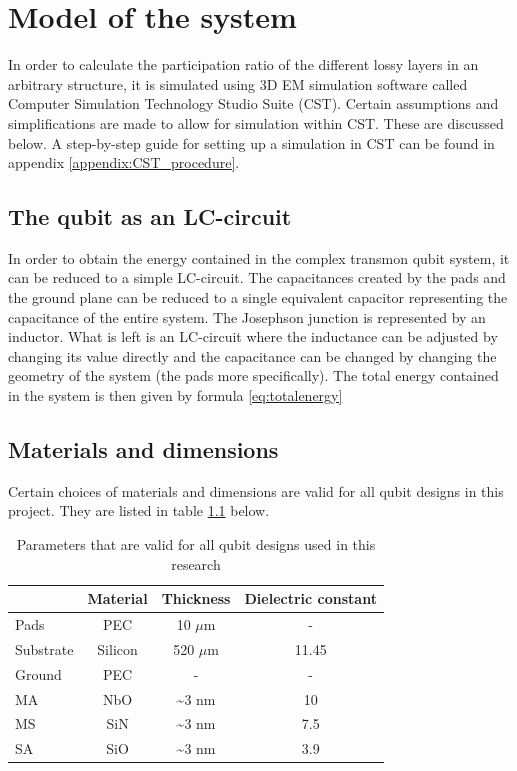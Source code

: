 \chapter{Model of the system}
In order to calculate the participation ratio of the different lossy layers in an arbitrary structure, it is simulated using 3D EM simulation software called Computer Simulation Technology Studio Suite (CST). Certain assumptions and simplifications are made to allow for simulation within CST. These are discussed below. A step-by-step guide for setting up a simulation in CST can be found in appendix \ref{appendix:CST_procedure}.

\section{The qubit as an LC-circuit}
In order to obtain the energy contained in the complex transmon qubit system, it can be reduced to a simple LC-circuit. The capacitances created by the pads and the ground plane can be reduced to a single equivalent capacitor representing the capacitance of the entire system. The Josephson junction is represented by an inductor. What is left is an LC-circuit where the inductance can be adjusted by changing its value directly and the capacitance can be changed by changing the geometry of the system (the pads more specifically). The total energy contained in the system is then given by formula \eqref{eq:totalenergy}

\section{Materials and dimensions}
Certain choices of materials and dimensions are valid for all qubit designs in this project. They are listed in table \ref{table:standard_parameters} below.

\begin{table}
	\begin{center}
		\begin{tabular}{ | l || c | c | c |}
			\hline
			 & Material & Thickness & Dielectric constant \\ \hline
			Pads & PEC & 10 \(\mu\)m & - \\
			Substrate & Silicon & 520 \(\mu\)m & 11.45 \\
			Ground & PEC & - & - \\
			MA & NbO & \textasciitilde 3 nm & 10 \\
			MS & SiN & \textasciitilde 3 nm & 7.5 \\
			SA & SiO & \textasciitilde 3 nm & 3.9 \\
			\hline
		\end{tabular}
	\end{center}
	\caption{Parameters that are valid for all qubit designs used in this research}
	\label{table:standard_parameters}
\end{table}


